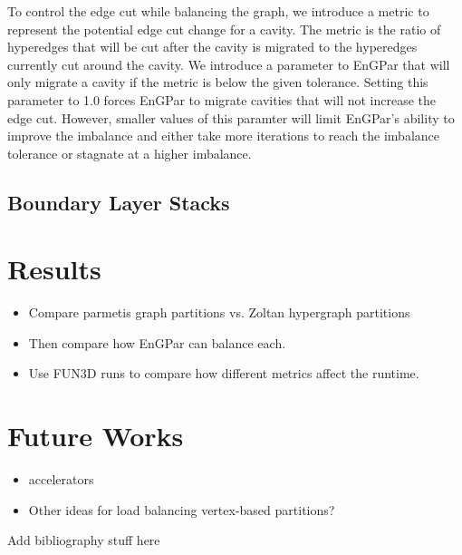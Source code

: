 \documentclass[conference]{IEEEtran}
\begin{document}
To control the edge cut while balancing the graph, we introduce a metric to represent the
potential edge cut change for a cavity. The metric is the ratio of hyperedges that will be cut
after the cavity is migrated to the hyperedges currently cut around the cavity. We introduce a
parameter to EnGPar that will only migrate a cavity if the metric is below the given tolerance.
Setting this parameter to 1.0 forces EnGPar to migrate cavities that will not increase the edge
cut. However, smaller values of this paramter will limit EnGPar's ability to improve the
imbalance and either take more iterations to reach the imbalance tolerance or stagnate at a
higher imbalance.

\subsection{Boundary Layer Stacks}


\section{Results}

\begin{itemize}
\item Compare parmetis graph partitions vs. Zoltan hypergraph partitions
\item Then compare how EnGPar can balance each.
\item Use FUN3D runs to compare how different metrics affect the runtime.
\end{itemize}


\section{Future Works}

\begin{itemize}
\item accelerators
\item Other ideas for load balancing vertex-based partitions?
\end{itemize}

{\color{red} Add bibliography stuff here}
\end{document}
